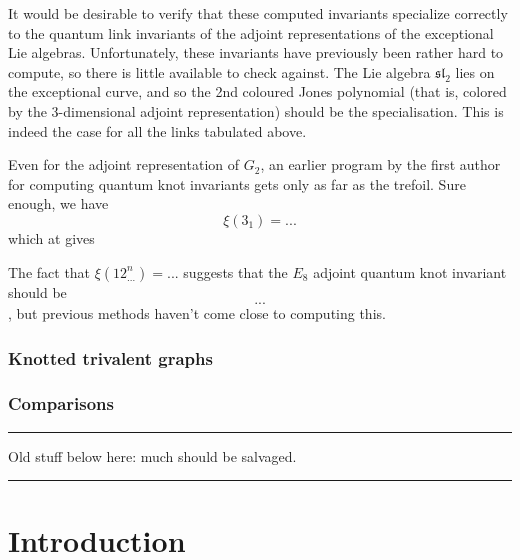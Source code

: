 \documentclass[12pt]{amsart}
\begin{document}
It would be desirable to verify that these computed invariants specialize 
correctly to the quantum link invariants of the adjoint representations of the
exceptional Lie algebras. Unfortunately, these invariants have previously been
rather hard to compute, so there is little available to check against. The Lie
algebra $\mathfrak{sl}_2$ lies on the exceptional curve, and so the 2nd
coloured Jones polynomial  (that is, colored by the 3-dimensional adjoint
representation) should be the  specialisation. This is
indeed the case for all the links tabulated above.

Even for the adjoint representation of $G_2$, an earlier program by the first
author for computing quantum knot invariants gets only as far as the trefoil. 
Sure enough, we have
$$\xi(3_1) = ...$$
which at  gives 


The fact that $\xi(12^n_{...}) = ...$ suggests that the $E_8$ adjoint quantum 
knot invariant should be $$...$$, but previous methods haven't come close to
computing this.

\subsubsection{Knotted trivalent graphs}\mbox{}%

\subsubsection{Comparisons}




\vspace{1cm}
\hrule
\vspace{1cm}

Old stuff below here: much should be salvaged.

\vspace{1cm}
\hrule
\vspace{1cm}


\appendix

\section{Introduction}
\label{sec:introduction}
\end{document}

